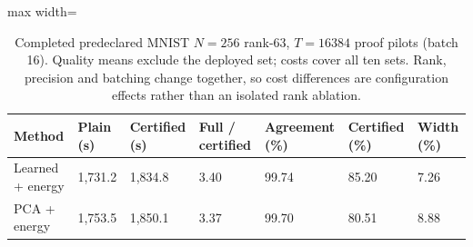 \begin{table}[tp]
\caption{Completed predeclared MNIST $N=256$ rank-63, $T=16384$ proof pilots (batch 16). Quality means exclude the deployed set; costs cover all ten sets. Rank, precision and batching change together, so cost differences are configuration effects rather than an isolated rank ablation.}\label{tab:proved-certificate-budget}
\centering\small
\begin{adjustbox}{max width=\textwidth}
\begin{tabular}{@{}lllllll@{}}
\toprule
Method & Plain (s) & Certified (s) & Full / certified & Agreement (\%) & Certified (\%) & Width (\%) \\
\midrule
Learned + energy & 1,731.2 & 1,834.8 & 3.40 & 99.74 & 85.20 & 7.26 \\
PCA + energy & 1,753.5 & 1,850.1 & 3.37 & 99.70 & 80.51 & 8.88 \\
\bottomrule
\end{tabular}
\end{adjustbox}
\end{table}
